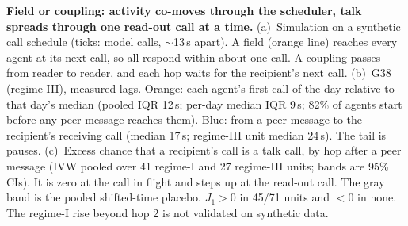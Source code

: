 \caption{\textbf{Field or coupling: activity co-moves through the scheduler, talk spreads through one read-out call at a time.}
(a)~Simulation on a synthetic call schedule (ticks: model calls, $\sim$13\,s apart). A field (orange line) reaches every agent at its next call, so all respond within about one call. A coupling passes from reader to reader, and each hop waits for the recipient's next call.
(b)~G38 (regime III), measured lags. Orange: each agent's first call of the day relative to that day's median (pooled IQR 12\,s; per-day median IQR 9\,s; 82\% of agents start before any peer message reaches them). Blue: from a peer message to the recipient's receiving call (median 17\,s; regime-III unit median 24\,s). The tail is pauses.
(c)~Excess chance that a recipient's call is a talk call, by hop after a peer message (IVW pooled over 41 regime-I and 27 regime-III units; bands are 95\% CIs). It is zero at the call in flight and steps up at the read-out call. The gray band is the pooled shifted-time placebo. $J_1>0$ in 45/71 units and $<0$ in none. The regime-I rise beyond hop 2 is not validated on synthetic data.}
\label{fig:H50}
